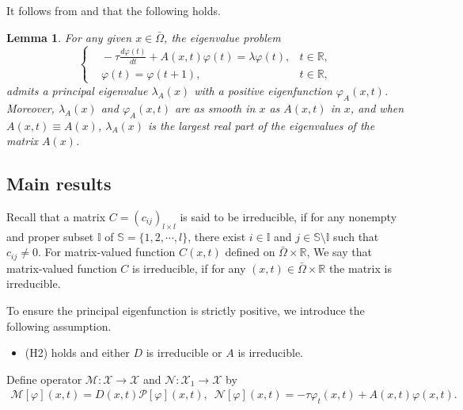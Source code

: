 \documentclass[11pt,reqno]{amsart}
\newtheorem{lemma}[theorem]{Lemma}
\numberwithin{equation}{section}
\begin{document}
It follows from \cite[Proposition 2.4]{LZZ1} and \cite[Theorem 1.4]{baihe} that the following holds.
\begin{lemma}\label{LEM1.2}
For any given $x\in\bar{\Omega}$, the eigenvalue problem
\begin{equation}\label{1-1}
\left\{
\begin{aligned}
&\!-\!\tau\frac{d\varphi(t)}{dt}+A(x,t)\varphi(t)=\lambda\varphi(t), &t\in\mathbb{R},\\
&\varphi(t)=\varphi(t+1), &t\in\mathbb{R},
\end{aligned}
\right.
\end{equation}
admits a principal eigenvalue $\lambda_{A}(x)$ with a positive eigenfunction $\varphi_{A}(x,t)$. Moreover, $\lambda_{A}(x)$ and $\varphi_{A}(x,t)$ are as smooth in $x$ as $A(x,t)$ in $x$, and when $A(x,t)\equiv A(x)$, $\lambda_{A}(x)$ is the largest real part of the eigenvalues of the matrix $A(x)$.
\end{lemma}

\subsection{Main results}
\indent
\newline
\newline
\indent
Recall that a matrix $C=(c_{ij})_{l\times l}$ is said to be irreducible, if for any nonempty and proper subset $\mathbb{I}$ of $\mathbb{S}=\{1,2,\cdots,l\}$, there exist $i\in \mathbb{I}$ and $j\in \mathbb{S}\setminus\mathbb{I}$ such that $c_{ij}\neq 0$.
For matrix-valued function $C(x,t)$ defined on $\bar\Omega\times\mathbb{R}$, We say that matrix-valued function $C$ is irreducible, if for any $(x,t)\in\bar{\Omega}\times \mathbb{R}$ the matrix is irreducible.

To ensure the principal eigenfunction is strictly positive, we introduce the following assumption.
\begin{itemize}[leftmargin=0.9cm]
\item[$ {\rm (\tilde{H}2) }$] (H2) holds and either $D$ is irreducible or $A$ is irreducible.
\end{itemize}
Define operator
$\mathcal{M}: \mathcal{X}\to \mathcal{X}$ and $\mathcal{N} : \mathcal{X}_{1} \to \mathcal{X}$ by
\begin{align*}
\mathcal{M}[\varphi](x,t)= D(x,t)\mathcal{P}[\varphi](x,t),
\enspace
\mathcal{N}[\varphi](x,t)= -\tau\varphi_{t}(x,t)+A(x,t)\varphi(x,t).
\end{align*}
\end{document}
